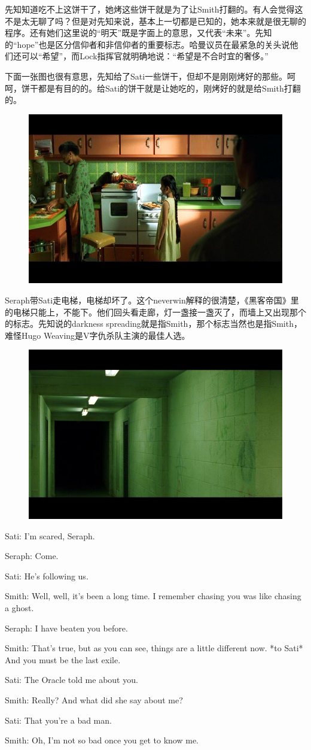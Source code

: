 \documentclass[UTF8]{ctexart}
\newenvironment{myquote}{\color{green} \setlength{\leftskip}{6em} \setlength{\rightskip}{4em} \setlength{\parindent}{-2em}}{\par}
\begin{document}
先知知道吃不上这饼干了，她烤这些饼干就是为了让Smith打翻的。有人会觉得这不是太无聊了吗？但是对先知来说，基本上一切都是已知的，她本来就是很无聊的程序。还有她们这里说的“明天”既是字面上的意思，又代表“未来”。先知的“hope”也是区分信仰者和非信仰者的重要标志。哈曼议员在最紧急的关头说他们还可以“希望”，而Lock指挥官就明确地说：“希望是不合时宜的奢侈。”

下面一张图也很有意思，先知给了Sati一些饼干，但却不是刚刚烤好的那些。呵呵，饼干都是有目的的。给Sati的饼干就是让她吃的，刚烤好的就是给Smith打翻的。

\begin{figure}[htb]
\centering
\includegraphics[width=0.5\linewidth]{fig/42486159b22efa2a2834f002.jpg}
\end{figure}

Seraph带Sati走电梯，电梯却坏了。这个neverwin解释的很清楚，《黑客帝国》里的电梯只能上，不能下。他们回头看走廊，灯一盏接一盏灭了，而墙上又出现那个的标志。先知说的darkness spreading就是指Smith，那个标志当然也是指Smith，难怪Hugo Weaving是V字仇杀队主演的最佳人选。

\begin{figure}[htb]
\centering
\includegraphics[width=0.5\linewidth]{fig/c621faf21812bd13b07ec502.jpg}
\end{figure}

\begin{myquote}
Sati: I'm scared, Seraph.

Seraph: Come.

Sati: He's following us.

Smith: Well, well, it's been a long time. I remember chasing you was like chasing a ghost.

Seraph: I have beaten you before.

Smith: That's true, but as you can see, things are a little different now. *to Sati* And you must be the last exile.

Sati: The Oracle told me about you.

Smith: Really? And what did she say about me?

Sati: That you're a bad man.

Smith: Oh, I'm not so bad once you get to know me.
\end{myquote}
\end{document}
